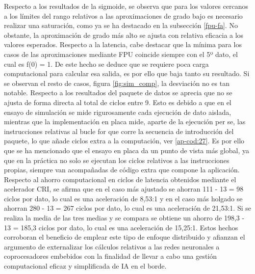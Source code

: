 Respecto a los resultados de la sigmoide, se observa que para los valores cercanos a los límites del rango relativos a las aproximaciones de grado bajo es necesario realizar una saturación, como ya se ha destacado en la subsección \ref{fpu-fa}.
No obstante, la aproximación de grado más alto se ajusta con relativa eficacia a los valores esperados.
Respecto a la latencia, cabe destacar que la mínima para los casos de las aproximaciones mediante FPU coincide siempre con el 5º dato, el cual es f(0) = 1.
De este hecho se deduce que se requiere poca carga computacional para calcular esa salida, es por ello que baja tanto su resultado.
Si se observan el resto de casos, figura \ref{fig:sim_comp}, la desviación no es tan notable.
Respecto a los resultados del paquete de datos se aprecia que no se ajusta de forma directa al total de ciclos entre 9.
Esto es debido a que en el ensayo de simulación se mide rigurosamente cada ejecución de dato aislada, mientras que la implementación en placa mide, aparte de la ejecución per se, las instrucciones relativas al bucle for que corre la secuencia de introducción del paquete, lo que añade ciclos extra a la computación, ver \ref{ap-cod:27}.
Es por ello que se ha mencionado que el ensayo en placa da un punto de vista más global, ya que en la práctica no solo se ejecutan los ciclos relativos a las instrucciones propias, siempre van acompañadas de código extra que compone la aplicación.
Respecto al ahorro computacional en ciclos de latencia obtenidos mediante el acelerador CRI, se afirma que en el caso más ajustado se ahorran 111 - 13 = 98 ciclos por dato, lo cual es una aceleración de 8,53:1 y en el caso más holgado se ahorran 280 - 13 = 267 ciclos por dato, lo cual es una aceleración de 21,53:1.
Si se realiza la media de las tres medias y se compara se obtiene un ahorro de 198,3 - 13 = 185,3 ciclos por dato, lo cual es una aceleración de 15,25:1.
Estos hechos corroboran el beneficio de emplear este tipo de enfoque distribuido y afianzan el argumento de externalizar los cálculos relativos a las redes neuronales a coprocesadores embebidos con la finalidad de llevar a cabo una gestión computacional eficaz y simplificada de IA en el borde.



